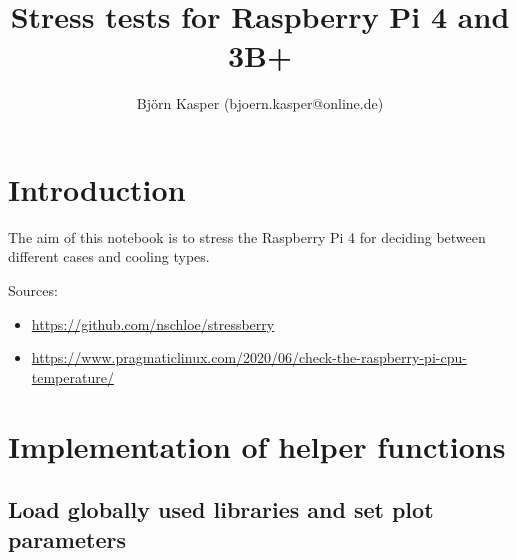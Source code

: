 \documentclass [oneside,10pt,a4paper,ngerman,BCOR10mm,headsepline,parindent,final]{scrartcl}
\title{Stress tests for Raspberry Pi 4 and 3B+}
\author{Björn Kasper (bjoern.kasper@online.de)}
\providecommand{\tightlist}{%
      \setlength{\itemsep}{0pt}\setlength{\parskip}{0pt}}
\begin{document}
    
    \maketitle
    \tableofcontents
    
    

    
    \hypertarget{introduction}{%
\section{Introduction}\label{introduction}}

The aim of this notebook is to stress the Raspberry Pi 4 for deciding
between different cases and cooling types.

Sources:

\begin{itemize}
\tightlist
\item
  \url{https://github.com/nschloe/stressberry}
\item
  \url{https://www.pragmaticlinux.com/2020/06/check-the-raspberry-pi-cpu-temperature/}
\end{itemize}

    \hypertarget{implementation-of-helper-functions}{%
\section{Implementation of helper
functions}\label{implementation-of-helper-functions}}

\hypertarget{load-globally-used-libraries-and-set-plot-parameters}{%
\subsection{Load globally used libraries and set plot
parameters}\label{load-globally-used-libraries-and-set-plot-parameters}}
\end{document}
